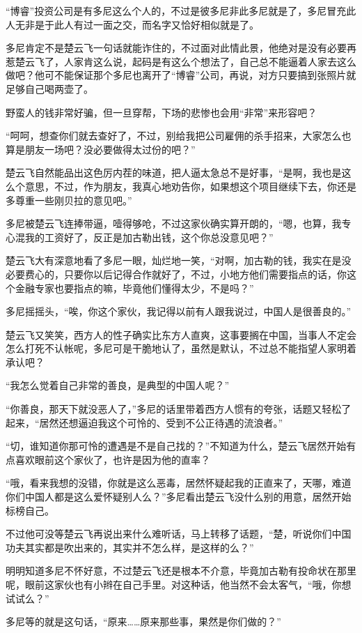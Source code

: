 “博睿”投资公司是有多尼这么个人的，不过是彼多尼非此多尼就是了，多尼冒充此人无非是于此人有过一面之交，而名字又恰好相似就是了。

多尼肯定不是楚云飞一句话就能诈住的，不过面对此情此景，他绝对是没有必要再惹楚云飞了，人家肯这么说，起码是有这么个想法了，自己总不能逼着人家去这么做吧？他可不能保证那个多尼也离开了“博睿”公司，再说，对方只要搞到张照片就足够自己喝两壶了。

野蛮人的钱非常好骗，但一旦穿帮，下场的悲惨也会用“非常”来形容吧？

“呵呵，想查你们就去查好了，不过，别给我把公司雇佣的杀手招来，大家怎么也算是朋友一场吧？没必要做得太过份的吧？”

楚云飞自然能品出这色厉内茬的味道，把人逼太急总不是好事，“是啊，我也是这么个意思，不过，作为朋友，我真心地劝告你，如果想这个项目继续下去，你还是多尊重一些刚贝拉的意见吧。”

多尼被楚云飞连捧带逼，噎得够呛，不过这家伙确实算开朗的，“嗯，也算，我专心混我的工资好了，反正是加古勒出钱，这个你总没意见吧？”

楚云飞大有深意地看了多尼一眼，灿烂地一笑，“对啊，加古勒的钱，我实在是没必要费心的，只要你以后记得合作就好了，不过，小地方他们需要指点的话，你这个金融专家也要指点的嘛，毕竟他们懂得太少，不是吗？”

多尼摇摇头，“唉，你这个家伙，我记得以前有人跟我说过，中国人是很善良的。”

楚云飞又笑笑，西方人的性子确实比东方人直爽，这事要搁在中国，当事人不定会怎么打死不认帐呢，多尼可是干脆地认了，虽然是默认，不过总不能指望人家明着承认吧？

“我怎么觉着自己非常的善良，是典型的中国人呢？”

“你善良，那天下就没恶人了，”多尼的话里带着西方人惯有的夸张，话题又轻松了起来，“居然还想逼迫我这个可怜的、受到不公正待遇的流浪者。”

“切，谁知道你那可怜的遭遇是不是自己找的？”不知道为什么，楚云飞居然开始有点喜欢眼前这个家伙了，也许是因为他的直率？

“哦，看来我想的没错，你就是这么恶毒，居然怀疑起我的正直来了，天哪，难道你们中国人都是这么爱怀疑别人么？”多尼看出楚云飞没什么别的用意，居然开始标榜自己。

不过他可没等楚云飞再说出来什么难听话，马上转移了话题，“楚，听说你们中国功夫其实都是吹出来的，其实并不怎么样，是这样的么？”

明明知道多尼不怀好意，不过楚云飞还是根本不介意，毕竟加古勒有投命状在那里呢，眼前这家伙也有小辫在自己手里。对这种话，他当然不会太客气，“哦，你想试试么？”

多尼等的就是这句话，“原来……原来那些事，果然是你们做的？”

